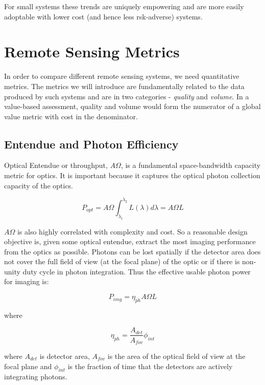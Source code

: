 \documentclass[10pt,journal]{IEEEtran}  %
\begin{document}
For small systems these trends are uniquely empowering and are more easily adoptable with lower cost (and hence less rsk-adverse) systems.

\section{Remote Sensing Metrics}
\label{sec:Metrics}
In order to compare different remote sensing systems, we need quantitative metrics.  The metrics we will introduce are fundamentally related to the data produced by such systems and are in two categories - \emph{quality} and \emph{volume}.  In a value-based assessment, quality and volume would form the numerator of a global value metric with cost in the denominator.

\subsection{Entendue and Photon Efficiency}
\label{sec:entendue}

Optical Entendue or throughput, $A \Omega$, is a fundamental space-bandwidth capacity metric for optics.  It is important because it captures the optical photon collection capacity of the optics. 

\begin{equation}
    P_{opt} = A\Omega \int_{\lambda_1}^{\lambda_2}L(\lambda) d\lambda = A\Omega L
\end{equation}

$A\Omega$ is also highly correlated with complexity and cost.  So a reasonable design objective is, given some optical entendue, extract the most imaging performance from the optics as possible.
Photons can be lost spatially if the detector area does not cover the full field of view (at the focal plane) of the optic or if there is non-unity duty cycle in photon integration.  Thus the effective usable photon power for imaging is:

\begin{equation}
    P_{img} = \eta_{ph} A \Omega L 
\end{equation}

where

\begin{equation}
    \eta_{ph} = \frac{A_{det}}{A_{fov}} \phi_{int}
\end{equation}

where $A_{det}$ is detector area, $A_{fov}$ is the area of the optical field of view at the focal plane and $\phi_{int}$ is the fraction of time that the detectors are actively integrating photons.  
\end{document}
